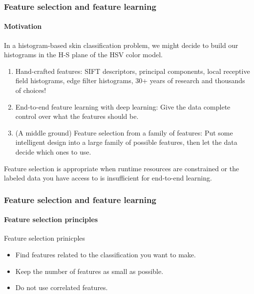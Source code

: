 \documentclass[aspectratio=169]{beamer}
\begin{document}
\begin{frame}
\frametitle{Feature selection and feature learning}
\framesubtitle{Motivation}

In a histogram-based skin classification problem, we might decide to
build our histograms in the H-S plane of the HSV color model.

\medskip


\begin{enumerate}

  \item \alert{Hand-crafted features}: SIFT descriptors,
    principal components, local receptive field histograms, edge
    filter histograms, 30+ years of research and thousands of choices!
  \item \alert{End-to-end feature learning with deep
    learning}:  Give the data complete control over what the features
    should be.
  \item (A middle ground) \alert{Feature selection from a family of
    features}: Put some intelligent design into a large family of
    possible features, then let the data decide which ones to use.
\end{enumerate}

\medskip

Feature selection is appropriate when runtime resources are
constrained or the labeled data you have access to is insufficient for
end-to-end learning.

\end{frame}


\begin{frame}
\frametitle{Feature selection and feature learning}
\framesubtitle{Feature selection principles}

\begin{block}{Feature selection prinicples}
\begin{itemize}
\item Find features \alert{related to the classification} you want to
  make.
\item Keep the \alert{number} of features as \alert{small} as possible.
\item Do not use \alert{correlated} features.
\end{itemize}
\end{block}

\end{frame}
\end{document}
